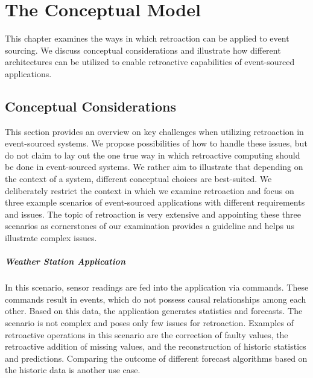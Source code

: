\chapter{The Conceptual Model}
\label{chp:concept}

This chapter examines the ways in which retroaction can be applied to event
sourcing. We discuss conceptual considerations and illustrate how 
different architectures can be utilized to enable retroactive capabilities 
of event-sourced applications.



\section{Conceptual Considerations}
This section provides an overview on key challenges when utilizing 
retroaction in event-sourced systems.
We propose possibilities of how to handle these issues, but do not 
claim to lay out the one true way in which retroactive computing should be 
done in event-sourced systems. We rather aim to illustrate that depending 
on the context of a system, different conceptual choices are best-suited.
We deliberately restrict the context in which we examine retroaction and 
focus on three example scenarios of event-sourced applications with different 
requirements and issues. 
The topic of retroaction is very extensive and appointing these three 
scenarios as cornerstones of our examination provides a guideline and helps 
us illustrate complex issues.

\paragraph{Weather Station Application} 
	In this scenario, sensor readings are fed into the application via commands.
	These commands result in events, which do not possess causal relationships 
	among each other. 
	Based on this data, the application generates statistics and forecasts. 
	The scenario is not complex and poses only few issues for retroaction.
	Examples of retroactive operations in this scenario are the correction of 
	faulty values, the retroactive addition of missing values, and the 
	reconstruction of historic statistics and predictions. 
	Comparing the outcome of different forecast algorithms based on the historic 
	data is another use case. 

